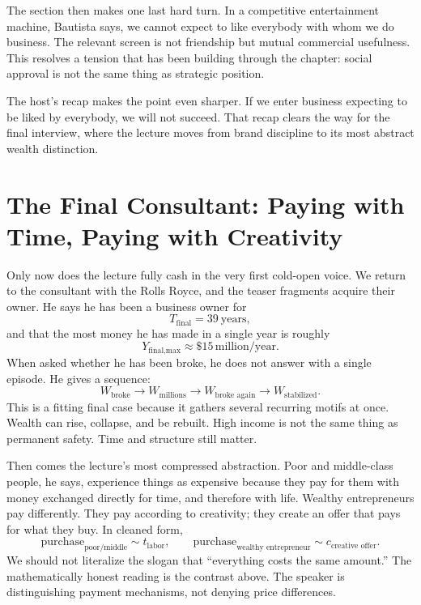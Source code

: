The section then makes one last hard turn. In a competitive entertainment machine, Bautista says, we cannot expect to like everybody with whom we do business. The relevant screen is not friendship but mutual commercial usefulness. This resolves a tension that has been building through the chapter: social approval is not the same thing as strategic position.

The host's recap makes the point even sharper. If we enter business expecting to be liked by everybody, we will not succeed. That recap clears the way for the final interview, where the lecture moves from brand discipline to its most abstract wealth distinction.

\section{The Final Consultant: Paying with Time, Paying with Creativity}

Only now does the lecture fully cash in the very first cold-open voice. We return to the consultant with the Rolls Royce, and the teaser fragments acquire their owner. He says he has been a business owner for
\begin{equation}
T_{\text{final}} = 39\ \text{years},
\end{equation}
and that the most money he has made in a single year is roughly
\begin{equation}
Y_{\text{final,max}} \approx \$15\,\text{million/year}.
\end{equation}
When asked whether he has been broke, he does not answer with a single episode. He gives a sequence:
\begin{equation}
W_{\text{broke}}
\to
W_{\text{millions}}
\to
W_{\text{broke again}}
\to
W_{\text{stabilized}}.
\end{equation}
This is a fitting final case because it gathers several recurring motifs at once. Wealth can rise, collapse, and be rebuilt. High income is not the same thing as permanent safety. Time and structure still matter.

Then comes the lecture's most compressed abstraction. Poor and middle-class people, he says, experience things as expensive because they pay for them with money exchanged directly for time, and therefore with life. Wealthy entrepreneurs pay differently. They pay according to creativity; they create an offer that pays for what they buy. In cleaned form,
\begin{equation}
\text{purchase}_{\text{poor/middle}}
\sim t_{\text{labor}},
\qquad
\text{purchase}_{\text{wealthy entrepreneur}}
\sim c_{\text{creative offer}}.
\end{equation}
We should not literalize the slogan that ``everything costs the same amount.'' The mathematically honest reading is the contrast above. The speaker is distinguishing payment mechanisms, not denying price differences.

